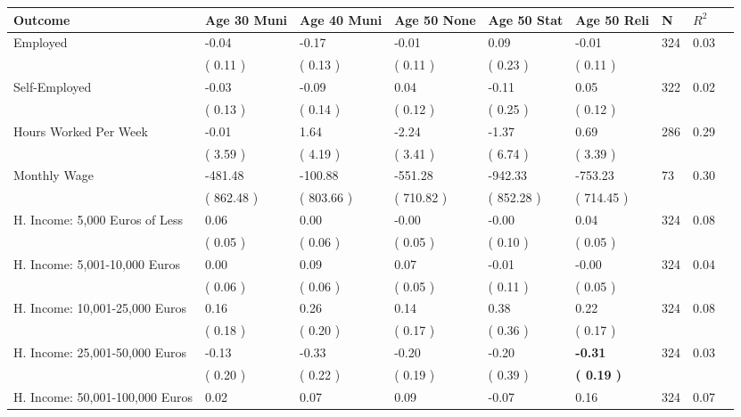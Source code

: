 \begin{tabular}{L{6.2cm} C{1.8cm} C{1.8cm} C{1.8cm} C{1.8cm} C{1.8cm} C{1.8cm} C{0.3cm} C{0.3cm}}
\toprule
 \textbf{Outcome} & \textbf{Age 30 Muni} & \textbf{Age 40 Muni} & \textbf{Age 50 None} & \textbf{Age 50 Stat} & \textbf{Age 50 Reli} & \textbf{N} & \textbf{$ R^2$} \\
\midrule
Employed &     -0.04 &     -0.17 &     -0.01 &      0.09 &     -0.01  & 324 &       0.03 \\ 
 & (     0.11 ) & (     0.13 ) & (     0.11 ) & (     0.23 ) & (     0.11 )  & \\
Self-Employed &     -0.03 &     -0.09 &      0.04 &     -0.11 &      0.05  & 322 &       0.02 \\ 
 & (     0.13 ) & (     0.14 ) & (     0.12 ) & (     0.25 ) & (     0.12 )  & \\
Hours Worked Per Week &     -0.01 &      1.64 &     -2.24 &     -1.37 &      0.69  & 286 &       0.29 \\ 
 & (     3.59 ) & (     4.19 ) & (     3.41 ) & (     6.74 ) & (     3.39 )  & \\
Monthly Wage &   -481.48 &   -100.88 &   -551.28 &   -942.33 &   -753.23  & 73 &       0.30 \\ 
 & (   862.48 ) & (   803.66 ) & (   710.82 ) & (   852.28 ) & (   714.45 )  & \\
H. Income: 5,000 Euros of Less &      0.06 &      0.00 &     -0.00 &     -0.00 &      0.04  & 324 &       0.08 \\ 
 & (     0.05 ) & (     0.06 ) & (     0.05 ) & (     0.10 ) & (     0.05 )  & \\
H. Income: 5,001-10,000 Euros &      0.00 &      0.09 &      0.07 &     -0.01 &     -0.00  & 324 &       0.04 \\ 
 & (     0.06 ) & (     0.06 ) & (     0.05 ) & (     0.11 ) & (     0.05 )  & \\
H. Income: 10,001-25,000 Euros &      0.16 &      0.26 &      0.14 &      0.38 &      0.22  & 324 &       0.08 \\ 
 & (     0.18 ) & (     0.20 ) & (     0.17 ) & (     0.36 ) & (     0.17 )  & \\
H. Income: 25,001-50,000 Euros &     -0.13 &     -0.33 &     -0.20 &     -0.20 & \textbf{    -0.31}  & 324 &       0.03 \\ 
 & (     0.20 ) & (     0.22 ) & (     0.19 ) & (     0.39 ) & \textbf{(     0.19 )}  & \\
H. Income: 50,001-100,000 Euros &      0.02 &      0.07 &      0.09 &     -0.07 &      0.16  & 324 &       0.07 \\ 

\end{tabular}

